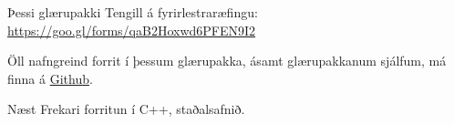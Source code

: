 \documentclass[handout]{beamer}
\begin{document}
\begin{frame}{Þessi glærupakki}
Tengill á fyrirlestraræfingu: \url{https://goo.gl/forms/qaB2Hoxwd6PFEN9I2}
\vspace{1cm}

Öll nafngreind forrit í þessum glærupakka, ásamt glærupakkanum sjálfum, má finna á  \href{https://github.com/Ernir/kennsluefni/tree/master/T2/Code/w1}{Github}.

\end{frame}


\begin{frame}{Næst}
Frekari forritun í C++, staðalsafnið.
\end{frame}
\end{document}
